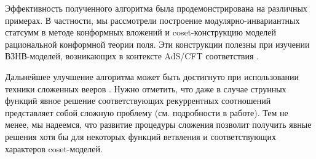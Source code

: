 Эффективность полученного алгоритма была продемонстрирована на различных примерах. В частности, мы рассмотрели построение модулярно-инвариантных статсумм в методе конформных вложений и coset-конструкцию моделей рациональной конформной теории поля. Эти конструкции полезны при изучении ВЗНВ-моделей, возникающих в контексте AdS/CFT соответствия \cite{Maldacena:2000hw,Maldacena:2000kv,Maldacena:2001km}.

Дальнейшее улучшение алгоритма может быть достигнуто при использовании техники сложенных вееров \cite{il2010folded}. Нужно отметить, что даже в случае струнных функций явное решение соответствующих рекуррентных соотношений представляет собой сложную проблему (см. подробности в работе\cite{il2010folded}). Тем не менее, мы надеемся, что развитие процедуры сложения позволит получить явные решения хотя бы для некоторых функций ветвления и соответствующих характеров coset-моделей.




